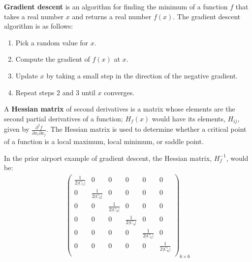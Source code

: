 \begin{definition}
    \textbf{Gradient descent} is an algorithm for finding the minimum of a function $f$ that takes a real number $x$ and returns a real number $f(x)$. The gradient descent algorithm is as follows:
    \begin{enumerate}
        \item Pick a random value for $x$.
        \item Compute the gradient of $f(x)$ at $x$.
        \item Update $x$ by taking a small step in the direction of the negative gradient.
        \item Repeat steps $2$ and $3$ until $x$ converges.
    \end{enumerate}
\end{definition}

\begin{definition}
    A \textbf{Hessian matrix} of second derivatives is a matrix whose elements are the second partial derivatives of a function; $H_{f}(x)$ would have its elements, $H_{ij}$, given by $\frac{\partial^{2} f}{\partial x_{i} \partial x_{j}}$. The Hessian matrix is used to determine whether a critical point of a function is a local maximum, local minimum, or saddle point.
\end{definition}

In the prior airport example of gradient descent, the Hessian matrix, $H_{f}^{-1}$, would be:
\begin{align*}
    \begin{pmatrix}
        \frac{1}{2|C_{1}|} & 0 & 0 & 0 & 0 & 0\\
        0 & \frac{1}{2|C_{2}|} & 0 & 0 & 0 & 0\\
        0 & 0 & \frac{1}{2|C_{3}|} & 0 & 0 & 0\\
        0 & 0 & 0 & \frac{1}{2|C_{4}|} & 0 & 0\\
        0 & 0 & 0 & 0 & \frac{1}{2|C_{5}|} & 0\\
        0 & 0 & 0 & 0 & 0 & \frac{1}{2|C_{6}|}\\
    \end{pmatrix}_{6 \times 6}
\end{align*}


